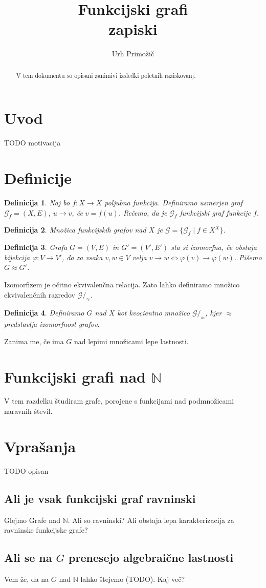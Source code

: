 \documentclass[a4paper,12pt]{article}
\author{Urh Primožič}
\title{Funkcijski grafi \\
\small{zapiski}}
\def\N{\mathbb{N}} %
\def\G{\mathcal{G}}
\newcommand{\p}{\to} %
\newtheorem{definicija}{Definicija}
\begin{document}
\maketitle
\begin{abstract}
    V tem dokumentu so opisani zanimivi izsledki poletnih raziskovanj.
\end{abstract}

\section{Uvod}
TODO motivacija 

\section{Definicije}

\begin{definicija}
    Naj bo $f \colon X \to X$ poljubna funkcija. 
    Definiramo usmerjen graf $\G_f=(X,E)$, $u \p v$, če $v = f(u)$. Rečemo, da je $\G_f$ funkcijski graf funkcije $f$.
\end{definicija}

\begin{definicija}
    Množica funkcijskih grafov nad $X$ je 
    $\G = \{\G_f \mid f \in X^X \}$.
\end{definicija}

\begin{definicija}
    Grafa $G=(V,E)$ in $G' = (V', E')$ sta 
    si izomorfna, če obstaja bijekcija $\varphi \colon V \to V'$, 
    da za vsaka $ v,w \in V$ velja $v \p w \iff \varphi(v) 
    \p \varphi(w)$. Pišemo $G \approx G'$.
\end{definicija}
Izomorfizem je očitno ekvivalenčna relacija. Zato lahko definiramo 
množico ekvivalenčnih razredov $\G/_\approx$.
\begin{definicija}
    Definiramo $G$ nad $X$ kot kvocientno 
    množico $\G /_\approx$, kjer $\approx$ predstavlja 
    izomorfnost grafov.
\end{definicija}

Zanima me, če ima $G$ nad lepimi množicami lepe lastnosti. 

\section{Funkcijski grafi nad $\N$}
V tem razdelku študiram grafe, porojene s funkcijami nad podmnožicami naravnih števil.
\section{Vprašanja}
TODO opisan


\subsection{Ali je vsak funkcijski graf ravninski}
Glejmo Grafe nad $\N$. Ali so ravninski? Ali obstaja lepa karakterizacija za ravninske funkcijske grafe?
\subsection{Ali se na $G$ prenesejo algebraične lastnosti}
Vem že, da na $G$ nad $\N$ lahko štejemo (TODO). Kaj več?
\end{document}
